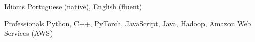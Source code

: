 
\begin{cvskills}
	\cvskill
	{Idioms}
	{Portuguese (native), English (fluent)}

	\cvskill
	{Professionals}
	{Python, C++, PyTorch, JavaScript, Java, Hadoop, Amazon Web Services (AWS)}

\end{cvskills}
